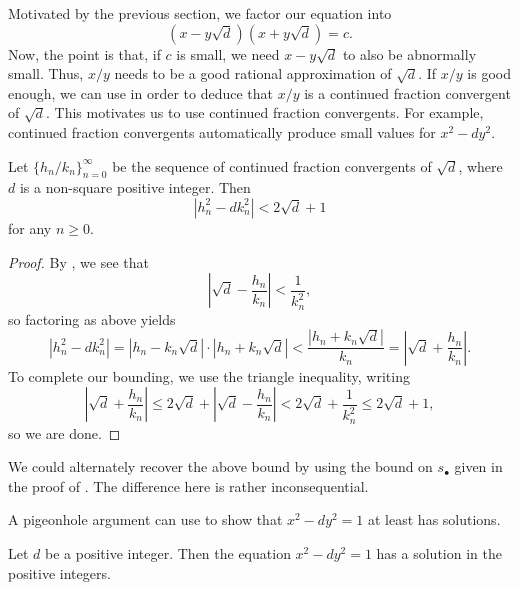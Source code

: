 \documentclass[../notes.tex]{subfiles}
\begin{document}
Motivated by the previous section, we factor our equation into
\[\left(x-y\sqrt d\right)\left(x+y\sqrt d\right)=c.\]
Now, the point is that, if $c$ is small, we need $x-y\sqrt d$ to also be abnormally small. Thus, $x/y$ needs to be a good rational approximation of $\sqrt d$. If $x/y$ is good enough, we can use  in order to deduce that $x/y$ is a continued fraction convergent of $\sqrt d$. This motivates us to use continued fraction convergents. For example, continued fraction convergents automatically produce small values for $x^2-dy^2$.
\begin{lemma} \label{lem:convs-give-small-pell}
	Let $\{h_n/k_n\}_{n=0}^\infty$ be the sequence of continued fraction convergents of $\sqrt d$, where $d$ is a non-square positive integer. Then
	\[\left|h_n^2-dk^2_n\right|<2\sqrt d+1\]
	for any $n\ge0$.
\end{lemma}
\begin{proof}
	By , we see that
	\[\left|\sqrt d-\frac{h_n}{k_n}\right|<\frac1{k_n^2},\]
	so factoring as above yields
	\[\left|h_n^2-dk_n^2\right|=\left|h_n-k_n\sqrt d\right|\cdot\left|h_n+k_n\sqrt d\right|<\frac{\left|h_n+k_n\sqrt d\right|}{k_n}=\left|\sqrt d+\frac{h_n}{k_n}\right|.\]
	To complete our bounding, we use the triangle inequality, writing
	\[\left|\sqrt d+\frac{h_n}{k_n}\right|\le2\sqrt d+\left|\sqrt d-\frac{h_n}{k_n}\right|<2\sqrt d+\frac1{k_n^2}\le2\sqrt d+1,\]
	so we are done.
\end{proof}
\begin{remark}
	We could alternately recover the above bound by using the bound on $s_\bullet$ given in the proof of . The difference here is rather inconsequential.
\end{remark}
A pigeonhole argument can use  to show that $x^2-dy^2=1$ at least has solutions.
\begin{proposition} \label{prop:pell-has-fund-sol}
	Let $d$ be a positive integer. Then the equation $x^2-dy^2=1$ has a solution in the positive integers.
\end{proposition}
\end{document}
